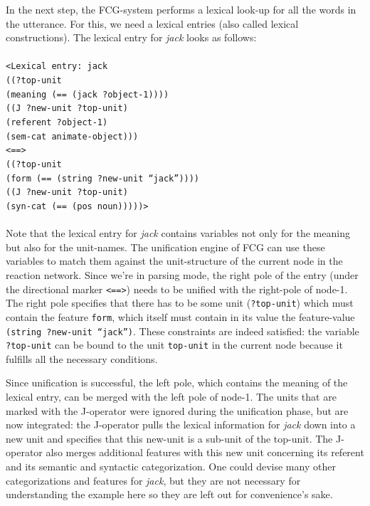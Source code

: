 In the next step, the FCG-system performs a lexical look-up for all the words in the utterance. For this, we need a lexical entries (also called lexical constructions). The lexical entry for {\em jack} looks as follows: 
\\
\\
{\footnotesize{\tt <Lexical entry: jack
\\ ((?top-unit
\\ \hspace*{5mm} (meaning (== (jack ?object-1))))
\\ \hspace*{2mm}((J ?new-unit ?top-unit)
\\ \hspace*{5mm} (referent ?object-1)
\\ \hspace*{5mm} (sem-cat animate-object)))
\\ <==>
\\ ((?top-unit
\\ \hspace*{5mm} (form (== (string ?new-unit ``jack''))))
\\ \hspace*{2mm}((J ?new-unit ?top-unit)
\\ \hspace*{5mm} (syn-cat (== (pos noun)))))>}}
\\
\\
Note that the lexical entry for {\em jack} contains variables not only for the meaning but also for the unit-names. The unification engine of FCG can use these variables to match them against the unit-structure of the current node in the reaction network. Since we're in parsing mode, the right pole of the entry (under the directional marker {\tt <==>}) needs to be unified with the right-pole of node-1. The right pole specifies that there has to be some unit ({\tt ?top-unit}) which must contain the feature {\tt form}, which itself must contain in its value the feature-value {\tt (string ?new-unit ``jack'')}. These constraints are indeed satisfied: the variable {\tt ?top-unit} can be bound to the unit {\tt top-unit} in the current node because it fulfills all the necessary conditions.

Since unification is successful, the left pole, which contains the meaning of the lexical entry, can be merged with the left pole of node-1. The units that are marked with the J-operator were ignored during the unification phase, but are now integrated: the J-operator pulls the lexical information for {\em jack} down into a new unit and specifies that this new-unit is a sub-unit of the top-unit. The J-operator also merges additional features with this new unit concerning its referent and its semantic and syntactic categorization. One could devise many other categorizations and features for {\em jack}, but they are not necessary for understanding the example here so they are left out for convenience's sake.

